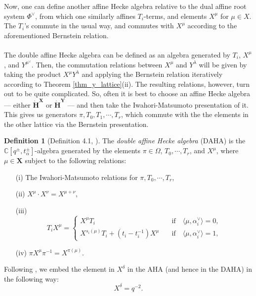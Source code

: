 \documentclass[a4paper]{report}
\theoremstyle{theorem}
\theoremstyle{definition}
\newtheorem{definition}{Definition}
\theoremstyle{remark}
\theoremstyle{proposition}
\theoremstyle{conjecture}
\theoremstyle{lemma}
\theoremstyle{corollary}
\theoremstyle{exercise}
\theoremstyle{example}
\newcommand{\C}{\mathbb{C}}
\begin{document}
  Now, one can define another affine Hecke algebra relative to the dual affine root system 
  $\Phi^\vee$, from which one similarly affines $T_i$-terms, and elements $X^\mu$ for $\mu \in X$. 
  The $T_i$'s commute in the usual way, and commutes with $X^\mu$ according to the aforementioned
  Bernstein relation. \\\\
  The double affine Hecke algebra can be defined as an algebra generated by $T_i$, $X^\mu$, and 
  $Y^{\mu^\vee}$. Then, the commutation relations between $X^\mu$ and $Y^\lambda$ will be given by
  taking the product $X^\mu Y^\lambda$ and applying the Bernstein relation iteratively according to
  Theorem \ref{thm_y_lattice}(ii). The resulting relations, however, turn out to be quite complicated. So, often it is best to choose an affine Hecke algebra ---
  either $\mathbf{\dot{H}}^{\mathbf{X}}$ or $\mathbf{\dot{H}}^{\mathbf{Y}}$ ---
  and then take the Iwahori-Matsumoto presentation of it. This gives us 
  generators $\pi, T_0,T_1,\cdots, T_r$, which commute with the the elements
  in the other lattice via the Bernstein presentation. 
  \begin{definition}[Definition 4.1, \cite{kir97}]
      The \emph{double affine Hecke algebra} (DAHA) is the $\C[q^\pm,t_\alpha^\pm]$-algebra generated by the elements $\pi\in \Omega$, $T_0,\cdots,T_r$, and 
      $X^\mu$, where $\mu \in \mathbf{X}$ subject to the following relations:
      \begin{itemize}
          \item[(i)] The Iwahori-Matsumoto relations for $\pi, T_0,\cdots,T_r$,
          \item[(ii)] $X^\mu \cdot X^\nu = X^{\mu + \nu}$,
          \item[(iii)] 
              $$T_i X^\mu = \begin{cases}
                  X^\mu T_i \quad &\text{if} \quad \langle \mu,\alpha_i^\vee\rangle = 0,\\
                  X^{s_i(\mu)}T_i + (t_i - t_i^{-1}) X^\mu \quad &\text{if} \quad \langle \mu,\alpha_i^\vee \rangle = 1,
              \end{cases}$$
          \item[(iv)] $\pi X^\mu \pi^{-1} = X^{\pi(\mu)}$.
      \end{itemize}
  \end{definition}
  Following \cite[pg. 274]{kir97}, we embed the element in $X^\delta$ in the AHA (and 
  hence in the DAHA) in the following way: 
  \begin{equation}\label{eqn_xdelta}
      X^{\delta} = q^{-2}.
  \end{equation}
\end{document}
